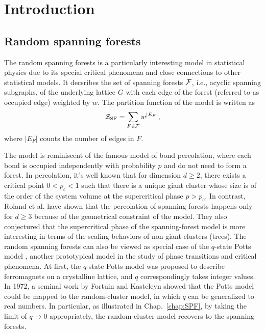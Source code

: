 \chapter{Introduction}\label{chap:intro}

\section{Random spanning forests}
The random spanning forests is a particularly interesting model in statistical physics due to its special critical phenomena
and close connections to other statistical models. It decsribes the set of spanning forests ${\mathcal F}$, i.e., acyclic spanning subgraphs, of the underlying
lattice $G$ with each edge of the forest (referred to as occupied edge) weighted by $w$. The partition function of the model is written as
\begin{equation}\label{eq:SPF_partition}
	{\mathcal Z}_{\text{SF}} = \sum_{F \in {\mathcal F}} w^{|E_F|},
\end{equation}
where $|E_F|$ counts the number of edges in $F$. 

The model is reminiscent of the famous model of bond percolation, where each bond is occupied independently with probability $p$ and do not need to form a forest.
In percolation, it's well known that for dimension $d \geq 2$, there exists a critical point $0 < p_c < 1$ such that there is a unique giant cluster whose size is of the order of the system volume
at the supercritical phase $p > p_c$. In contrast, Roland et al. \cite{Roland2021Percolation} have shown that the percolation of spanning forests happens only for $d \geq 3$ 
because of the geometrical constraint of the model. They also conjectured that the supercritical phase of the spanning-forest model is more interesting in terms of the scaling behaviors of non-giant clusters (trees). 
The random spanning forests can also be viewed as special case of the $q$-state Potts model \cite{Potts1952, Wu1982}, another prototypical model in the study of phase transitions and critical phenomena.
At first, the $q$-state Potts model was proposed to describe ferromagnets on a crystalline lattice, and $q$ correspondingly takes integer values.
In 1972, a seminal work by Fortuin and Kasteleyn \cite{Fortuin1972} showed that the Potts model could be mapped to the random-cluster model, in which $q$ can be 
generalized to real numbers. In particular, as illustrated in Chap.~\ref{chap:SPF}, by taking the limit of $q\to 0$ appropriately,
the random-cluster model recovers to the spanning forests.

